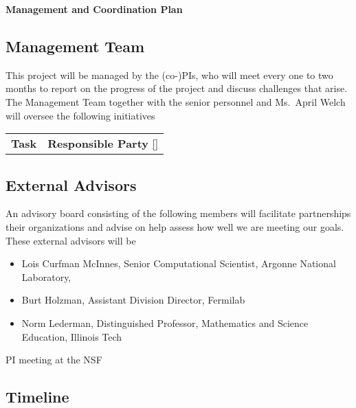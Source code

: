 \documentclass[11pt]{NSFamsart}
\begin{document}
\setlength{\leftmargini}{2.5ex}

\centerline{\textbf{\Large Management and Coordination Plan}}

\bigskip

\subsection*{Management Team} This project will be managed by the (co-)PIs, who will meet every one to two months to report on the progress of the project and discuss challenges that arise.  The Management Team together with the senior personnel and Ms.~April Welch will oversee the following initiatives

\begin{tabular}
{>{\flushleft}p{}>{\flushleft}p{}}
\textbf{Task} & \textbf{Responsible Party}
\ref{}
\end{tabular}

\subsection*{External Advisors}  An advisory board consisting of the following members will facilitate partnerships their organizations and advise on help assess how well we are meeting our goals.  These external advisors will be
\begin{itemize}
\item Lois Curfman McInnes, Senior Computational Scientist, Argonne National Laboratory,
\item Burt Holzman, Assistant Division Director, Fermilab
\item Norm Lederman, Distinguished Professor, Mathematics and Science Education, Illinois Tech

\end{itemize}

PI meeting at the NSF

\subsection*{Timeline}
\end{document}
